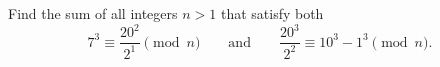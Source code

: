 Find the sum of all integers $n>1$ that satisfy both
\[7^3\equiv\dfrac{20^2}{2^1}\pmod n\qquad\text{and}\qquad\dfrac{20^3}{2^2}\equiv10^3-1^3\pmod n .\]
